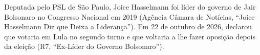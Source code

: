 Deputada pelo PSL de São Paulo, Joice Hasselmann foi líder do governo de Jair Bolsonaro no Congresso Nacional em 2019 (Agência Câmara de Notícias, \enquote{Joice Hasselmann Diz que Deixa a Liderança}).
Em 22 de outubro de 2026, declarou que votaria em Lula no segundo turno e que voltaria a lhe fazer oposição depois da eleição (R7, \enquote{Ex-Líder do Governo Bolsonaro}).
